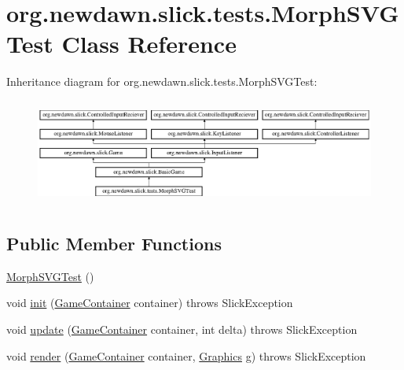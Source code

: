 \hypertarget{classorg_1_1newdawn_1_1slick_1_1tests_1_1_morph_s_v_g_test}{}\section{org.\+newdawn.\+slick.\+tests.\+Morph\+S\+V\+G\+Test Class Reference}
\label{classorg_1_1newdawn_1_1slick_1_1tests_1_1_morph_s_v_g_test}
Inheritance diagram for org.\+newdawn.\+slick.\+tests.\+Morph\+S\+V\+G\+Test\+:\begin{figure}[H]
\begin{center}
\leavevmode
\includegraphics[height=3.522012cm]{classorg_1_1newdawn_1_1slick_1_1tests_1_1_morph_s_v_g_test}
\end{center}
\end{figure}
\subsection*{Public Member Functions}
\begin{DoxyCompactItemize}
\item 
\mbox{\hyperlink{classorg_1_1newdawn_1_1slick_1_1tests_1_1_morph_s_v_g_test_a81c7ae3211150308d5a3f51b5870eb89}{Morph\+S\+V\+G\+Test}} ()
\item 
void \mbox{\hyperlink{classorg_1_1newdawn_1_1slick_1_1tests_1_1_morph_s_v_g_test_ab88e4df732664e1f4c61763b27bfe331}{init}} (\mbox{\hyperlink{classorg_1_1newdawn_1_1slick_1_1_game_container}{Game\+Container}} container)  throws Slick\+Exception 
\item 
void \mbox{\hyperlink{classorg_1_1newdawn_1_1slick_1_1tests_1_1_morph_s_v_g_test_a0a8a1de7e09f3e8e7129000d1cd336c6}{update}} (\mbox{\hyperlink{classorg_1_1newdawn_1_1slick_1_1_game_container}{Game\+Container}} container, int delta)  throws Slick\+Exception 
\item 
void \mbox{\hyperlink{classorg_1_1newdawn_1_1slick_1_1tests_1_1_morph_s_v_g_test_a5cface01ccba85c788713be17cd8a112}{render}} (\mbox{\hyperlink{classorg_1_1newdawn_1_1slick_1_1_game_container}{Game\+Container}} container, \mbox{\hyperlink{classorg_1_1newdawn_1_1slick_1_1_graphics}{Graphics}} g)  throws Slick\+Exception 
\end{DoxyCompactItemize}
